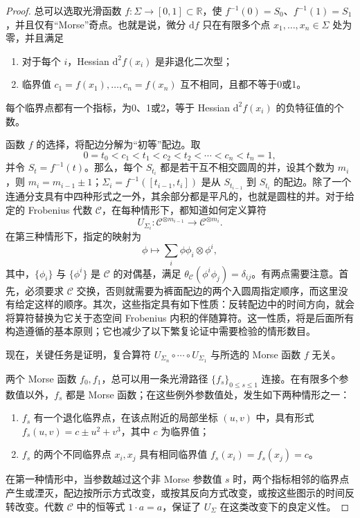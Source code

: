 \begin{proof}
总可以选取光滑函数 $f\colon\Sigma\to[0,1]\subset\mathbb{R}$，使 $f^{-1}(0)=S_0$、$f^{-1}(1)=S_1$，并且仅有“Morse”奇点。也就是说，微分 $\mathrm{d}f$ 只在有限多个点 $x_1,\ldots,x_n\in\Sigma$ 处为零，并且满足
\begin{enumerate}[label=(\roman*)]
\item 对于每个 $i$，Hessian $\mathrm{d}^2f(x_i)$ 是非退化二次型；
\item 临界值 $c_1=f(x_1),\ldots,c_n=f(x_n)$ 互不相同，且都不等于0或1。
\end{enumerate}
每个临界点都有一个指标，为0、1或2，等于 Hessian $\mathrm{d}^2f(x_i)$ 的负特征值的个数。

函数 $f$ 的选择，将配边分解为“初等”配边。取
\[
0=t_0<c_1<t_1<c_2<t_2<\cdots<c_n<t_n=1,
\]
并令 $S_t=f^{-1}(t)$。那么，每个 $S_{t_i}$ 都是若干互不相交圆周的并，设其个数为 $m_i$，则 $m_i=m_{i-1}\pm1$；$\Sigma_i=f^{-1}([t_{i-1},t_i])$ 是从 $S_{t_{i-1}}$ 到 $S_{t_i}$ 的配边。除了一个连通分支具有中四种形式之一外，其余部分都是平凡的，也就是圆柱的并。对于给定的 Frobenius 代数 $\mathcal{C}$，在每种情形下，都知道如何定义算符
\[
U_{\Sigma_i}\colon\mathcal{C}^{\otimes m_{i-1}}\longrightarrow\mathcal{C}^{\otimes m_i}.
\]
在第三种情形下，指定的映射为
\[
\phi\longmapsto\sum_i\phi\phi_i\otimes\phi^i,
\]
其中，$\{\phi_i\}$ 与 $\{\phi^i\}$ 是 $\mathcal{C}$ 的对偶基，满足 $\theta_{\mathcal{C}}(\phi^i\phi_j)=\delta_{ij}$。有两点需要注意。首先，必须要求 $\mathcal{C}$ 交换，否则就需要为裤面配边的两个入圆周指定顺序，而这里没有给定这样的顺序。其次，这些指定具有如下性质：反转配边中的时间方向，就会将算符替换为它关于态空间 Frobenius 内积的伴随算符。这一性质，将是后面所有构造遵循的基本原则；它也减少了以下繁复论证中需要检验的情形数目。

现在，关键任务是证明，复合算符 $U_{\Sigma_n}\circ\cdots\circ U_{\Sigma_1}$ 与所选的 Morse 函数 $f$ 无关。

\begin{figure}[H]
\centering
{}
\BookNumberOnlyCaption\label{fig:2.31}
\end{figure}

两个 Morse 函数 $f_0,f_1$，总可以用一条光滑路径 $\{f_s\}_{0\le s\le1}$ 连接。在有限多个参数值以外，$f_s$ 都是 Morse 函数；在这些例外参数值处，发生如下两种情形之一：
\begin{enumerate}[label=(\roman*)]
\item $f_s$ 有一个退化临界点，在该点附近的局部坐标 $(u,v)$ 中，具有形式 $f_s(u,v)=c\pm u^2+v^3$，其中 $c$ 为临界值；
\item $f_s$ 的两个不同临界点 $x_i,x_j$ 具有相同临界值 $f_s(x_i)=f_s(x_j)=c$。
\end{enumerate}
在第一种情形中，当参数越过这个非 Morse 参数值 $s$ 时，两个指标相邻的临界点产生或湮灭，配边按所示方式改变，或按其反向方式改变，或按这些图示的时间反转改变。代数 $\mathcal{C}$ 中的恒等式 $1\cdot a=a$，保证了 $U_\Sigma$ 在这类改变下的良定义性。


\end{proof}
